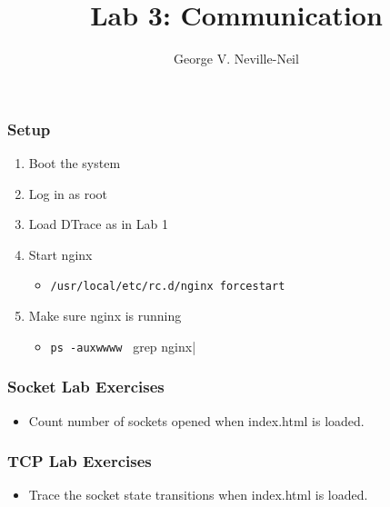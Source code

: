\documentclass[pdftex]{beamer}
\begin{document}

\title{Lab 3: Communication}
\author[shortname]{George V. Neville-Neil}

\begin{frame}[fragile]
  \frametitle{Setup}
  \begin{enumerate}
  \item Boot the system
  \item Log in as root
  \item Load DTrace as in Lab 1
  \item Start nginx
    \begin{itemize}
    \item \verb|/usr/local/etc/rc.d/nginx forcestart|
    \end{itemize}
  \item Make sure nginx is running
    \begin{itemize}
    \item \verb|ps -auxwwww | grep nginx|
    \end{itemize}
  \end{enumerate}
\end{frame}

\begin{frame}[fragile]
  \frametitle{Socket Lab Exercises}
  \begin{itemize}
  \item Count number of sockets opened when index.html is loaded.
  \end{itemize}
\end{frame}

\begin{frame}
  \frametitle{TCP Lab Exercises}
  \begin{itemize}
  \item Trace the socket state transitions when index.html is loaded.
  \end{itemize}
\end{frame}
\end{document}
